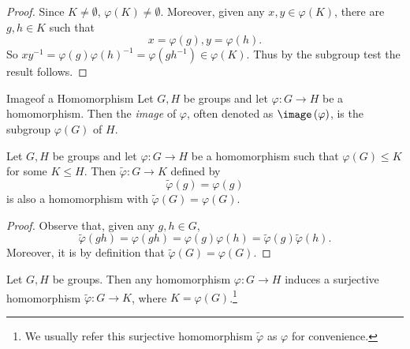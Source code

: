 \documentclass[pmath347]{subfiles}
\begin{document}
    \begin{proof}
        Since $K\neq\emptyset$, $\varphi\left( K \right) \neq\emptyset$. Moreover, given any $x,y\in\varphi\left( K \right)$, there are $g,h\in K$ such that
        \begin{equation*}
            x = \varphi\left( g \right) , y=\varphi\left( h \right) .
        \end{equation*}
        So $xy^{-1} = \varphi\left( g \right) \varphi\left( h \right) ^{-1} = \varphi\left( gh^{-1}  \right) \in \varphi\left( K \right)$. Thus by the subgroup test the result follows.
    \end{proof}

    \begin{definition}{Image}{of a Homomorphism}
        Let $G,H$ be groups and let $\varphi:G\to H$ be a homomorphism. Then the \emph{image} of $\varphi$, often denoted as $\image\left( \varphi \right)$, is the subgroup $\varphi\left( G \right)$ of $H$.
    \end{definition}

    \begin{prop}{}
        Let $G,H$ be groups and let $\varphi:G\to H$ be a homomorphism such that $\varphi\left( G \right) \leq K$ for some $K\leq H$. Then $\tilde{\varphi}:G\to K$ defined by
        \begin{equation*}
            \tilde{\varphi} \left( g \right) = \varphi\left( g \right) 
        \end{equation*}
        is also a homomorphism with $\tilde{\varphi}\left( G \right) = \varphi\left( G \right)$.
    \end{prop}

    \begin{proof}
        Observe that, given any $g,h\in G$,
        \begin{equation*}
            \tilde{\varphi} \left( gh \right) = \varphi\left( gh \right) = \varphi\left( g \right) \varphi\left( h \right) = \tilde{\varphi} \left( g \right) \tilde{\varphi} \left( h \right) .
        \end{equation*}
        Moreover, it is by definition that $\tilde{\varphi} \left( G \right) = \varphi\left( G \right)$.
    \end{proof}

    \clearpage
    \begin{cor}{}
        Let $G,H$ be groups. Then any homomorphism $\varphi:G\to H$ induces a surjective homomorphism $\tilde{\varphi}:G\to K$, where $K=\varphi\left( G \right)$.\footnote{We usually refer this surjective homomorphism $\tilde{\varphi}$ as $\varphi$ for convenience.} 
    \end{cor}	
    
\end{document}
